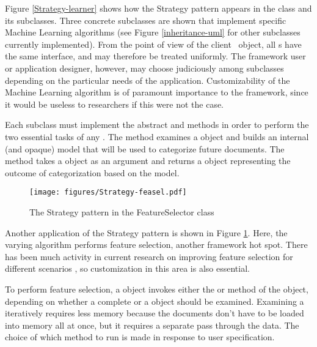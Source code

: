Figure \ref{Strategy-learner} shows how the Strategy pattern appears
in the  class and its subclasses.  Three concrete
subclasses are shown that implement specific Machine Learning
algorithms (see Figure \ref{inheritance-uml} for other 
subclasses currently implemented).  From the point of view of the
client \aicat\ object, all s have the same interface,
and may therefore be treated uniformly.  The framework user or
application designer, however, may choose judiciously among subclasses
depending on the particular needs of the application.  Customizability
of the Machine Learning algorithm is of paramount importance to the
framework, since it would be useless to researchers if this were not
the case.

Each  subclass must implement the abstract
 and  methods in order to perform the
two essential tasks of any .  The  method
examines a  object and builds an internal (and
opaque) model that will be used to categorize future documents.  The
 method takes a  object as an
argument and returns a  object representing the
outcome of categorization based on the model.

\begin{figure}
\texttt{[image: figures/Strategy-feasel.pdf]}
\caption{The Strategy pattern in the FeatureSelector class}
\label{Strategy-feasel}
\end{figure}

Another application of the Strategy pattern is shown in Figure
\ref{Strategy-feasel}.  Here, the varying algorithm performs
feature selection, another framework hot spot.  There has been much
activity in current research on improving feature selection for
different scenarios \cite{yang:01,yang:97}, so customization in this
area is also essential.

To perform feature selection, a  object invokes
either the  or  method
of the  object, depending on whether a complete
 or a  object should be
examined.  Examining a  iteratively requires less
memory because the documents don't have to be loaded into memory all
at once, but it requires a separate pass through the data.  The choice
of which method to run is made in response to user specification.

